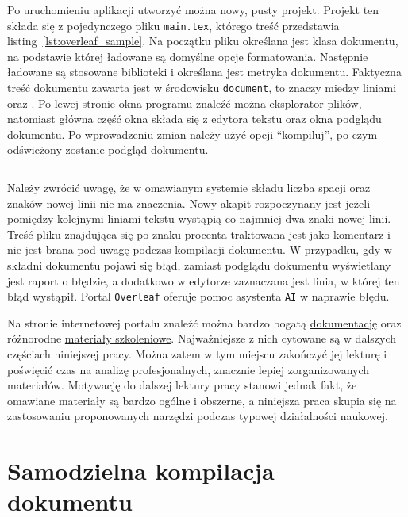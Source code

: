 Po uruchomieniu aplikacji utworzyć można nowy, pusty projekt. Projekt ten składa się z pojedynczego pliku \texttt{main.tex}, którego treść przedstawia listing~\ref{lst:overleaf_sample}. Na początku pliku określana jest klasa dokumentu, na podstawie której ładowane są domyślne opcje formatowania. Następnie ładowane są stosowane biblioteki i określana jest metryka dokumentu. Faktyczna treść dokumentu zawarta jest w środowisku \texttt{document}, to znaczy miedzy liniami \verb|| oraz \verb||. Po lewej stronie okna programu znaleźć można eksplorator plików, natomiast główna część okna składa się z edytora tekstu oraz okna podglądu dokumentu. Po wprowadzeniu zmian należy użyć opcji \enquote{kompiluj}, po czym odświeżony zostanie podgląd dokumentu.

\begin{listing}[htb]
\inputminted{latex}{skrypty/overleaf_sample.tex}
\end{listing}

Należy zwrócić uwagę, że w omawianym systemie składu liczba spacji oraz znaków nowej linii nie ma znaczenia. Nowy akapit rozpoczynany jest jeżeli pomiędzy kolejnymi liniami tekstu wystąpią co najmniej dwa znaki nowej linii. Treść pliku znajdująca się po znaku procenta traktowana jest jako komentarz i nie jest brana pod uwagę podczas kompilacji dokumentu. W przypadku, gdy w składni dokumentu pojawi się błąd, zamiast podglądu dokumentu wyświetlany jest raport o błędzie, a dodatkowo w edytorze zaznaczana jest linia, w której ten błąd wystąpił. Portal \texttt{Overleaf} oferuje pomoc asystenta \texttt{AI} w naprawie błędu.

Na stronie internetowej portalu znaleźć można bardzo bogatą \href{https://www.overleaf.com/learn}{dokumentację} oraz różnorodne \href{https://www.overleaf.com/learn/latex/Learn_LaTeX_in_30_minutes}{materiały szkoleniowe}. Najważniejsze z nich cytowane są w dalszych częściach niniejszej pracy. Można zatem w tym miejscu zakończyć jej lekturę i poświęcić czas na analizę profesjonalnych, znacznie lepiej zorganizowanych materiałów. Motywację do dalszej lektury pracy stanowi jednak fakt, że omawiane materiały są bardzo ogólne i obszerne, a niniejsza praca skupia się na zastosowaniu proponowanych narzędzi podczas typowej działalności naukowej.

\section{Samodzielna kompilacja dokumentu}

